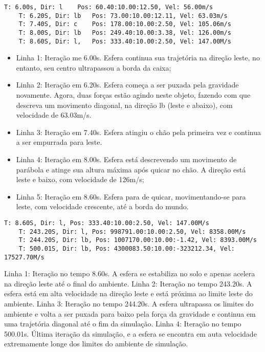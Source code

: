 \documentclass[12pt]{article}
\begin{document}
\begin{lstlisting}[frame=single,caption=Esfera se movendo diagonalmente\label{lg:esfera_m3}]
	T: 6.00s, Dir: l	Pos: 60.40:10.00:12.50, Vel: 56.00m/s
	T: 6.20S, Dir: lb 	Pos: 73.00:10.00:12.11, Vel: 63.03m/s
	T: 7.40S, Dir: c 	Pos: 178.00:10.00:2.50, Vel: 105.06m/s
	T: 8.00S, Dir: lb 	Pos: 249.40:10.00:3.38, Vel: 126.00m/s
	T: 8.60S, Dir: l, 	Pos: 333.40:10.00:2.50, Vel: 147.00M/s
\end{lstlisting}

\begin{itemize}
	\item Linha 1: Iteração me 6.00s. Esfera continua sua trajetória na direção leste, no entanto, seu centro ultrapassou a borda da caixa;
	
	\item Linha 2: Iteração em 6.20s. Esfera começa a ser puxada pela gravidade novamente. Agora, duas forças estão agindo neste objeto, fazendo com que descreva um movimento diagonal, na direção lb (leste e abaixo), com velocidade de 63.03m/s.
	
	\item Linha 3: Iteração em 7.40s. Esfera atingiu o chão pela primeira vez e continua a ser empurrada para leste.
	
	\item Linha 4: Iteração em 8.00s. Esfera está descrevendo um movimento de parábola e atinge sua altura máxima após quicar no chão. A direção está leste e baixo, com velocidade de 126m/s;
	
	\item Linha 5: Iteração em 8.60s. Esfera para de quicar, movimentando-se para leste, com velocidade crescente, até a borda do mundo.
\end{itemize}

\begin{lstlisting}[frame=single,caption=Esfera sobre o chão e saída do ambiente\label{lg:esferaM4}]
	T: 8.60S, Dir: l, Pos: 333.40:10.00:2.50, Vel: 147.00M/s
	T: 243.20S, Dir: l, Pos: 998791.00:10.00:2.50, Vel: 8358.00M/s
	T: 244.20S, Dir: lb, Pos: 1007170.00:10.00:-1.42, Vel: 8393.00M/s
	T: 500.01S, Dir: lb, Pos: 4300083.50:10.00:-323212.34, Vel: 17527.70M/s
\end{lstlisting}

Linha 1: Iteração no tempo 8.60s. A esfera se estabiliza no solo e apenas acelera na direção leste até o final do ambiente.
Linha 2: Iteração no tempo 243.20s. A esfera está em alta velocidade na direção leste e está próxima ao limite leste do ambiente.
Linha 3: Iteração no tempo 244.20s. A esfera ultrapassa os limites do ambiente e volta a ser puxada para baixo pela força da gravidade e continua em uma trajetória diagonal até o fim da simulação.
Linha 4: Iteração no tempo 500.01s. Última iteração da simulação, e a esfera se encontra em auta velocidade extremamente longe dos limites do ambiente de simulação.
\end{document}
